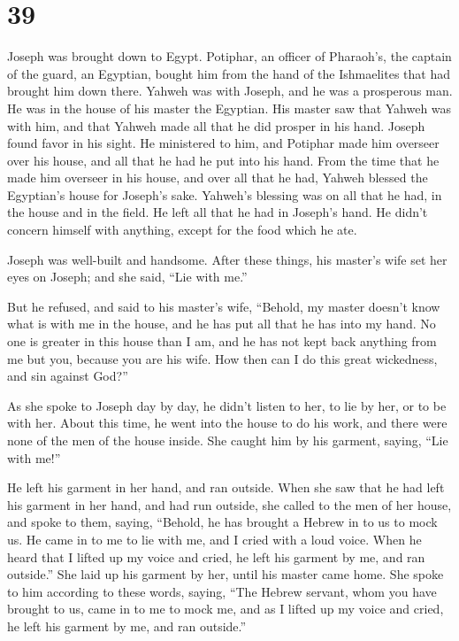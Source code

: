 \hypertarget{section-38}{%
\section{39}\label{section-38}}

 Joseph was brought down to Egypt. Potiphar, an officer of
Pharaoh's, the captain of the guard, an Egyptian, bought him from the
hand of the Ishmaelites that had brought him down there. 
Yahweh was with Joseph, and he was a prosperous man. He was in the house
of his master the Egyptian.  His master saw that Yahweh was
with him, and that Yahweh made all that he did prosper in his hand.
 Joseph found favor in his sight. He ministered to him, and
Potiphar made him overseer over his house, and all that he had he put
into his hand.  From the time that he made him overseer in
his house, and over all that he had, Yahweh blessed the Egyptian's house
for Joseph's sake. Yahweh's blessing was on all that he had, in the
house and in the field.  He left all that he had in Joseph's
hand. He didn't concern himself with anything, except for the food which
he ate.

Joseph was well-built and handsome.  After these things, his
master's wife set her eyes on Joseph; and she said, ``Lie with me.''

 But he refused, and said to his master's wife, ``Behold, my
master doesn't know what is with me in the house, and he has put all
that he has into my hand.  No one is greater in this house
than I am, and he has not kept back anything from me but you, because
you are his wife. How then can I do this great wickedness, and sin
against God?''

 As she spoke to Joseph day by day, he didn't listen to
her, to lie by her, or to be with her.  About this time, he
went into the house to do his work, and there were none of the men of
the house inside.  She caught him by his garment, saying,
``Lie with me!''

He left his garment in her hand, and ran outside.  When she
saw that he had left his garment in her hand, and had run outside,
 she called to the men of her house, and spoke to them,
saying, ``Behold, he has brought a Hebrew in to us to mock us. He came
in to me to lie with me, and I cried with a loud voice. 
When he heard that I lifted up my voice and cried, he left his garment
by me, and ran outside.''  She laid up his garment by her,
until his master came home.  She spoke to him according to
these words, saying, ``The Hebrew servant, whom you have brought to us,
came in to me to mock me,  and as I lifted up my voice and
cried, he left his garment by me, and ran outside.''

